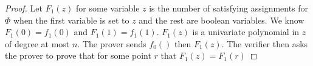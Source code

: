 \begin{proof}
	Let $F_1(z)$ for some variable $z$ is the number of satisfying assignments for $\Phi$ when the first variable is set to $z$ and the rest are boolean variables.  We know $F_1(0) = f_1(0)$ and $F_1(1)=f_1(1)$.  $F_1(z)$ is a univariate polynomial in $z$ of degree at most $n$.  The prover sends $f_0()$ then $F_1(z)$.  The verifier then asks the prover to prove that for some point $r$ that $F_1(z)=F_1(r)$
	

	
	
	
	
\end{proof}




